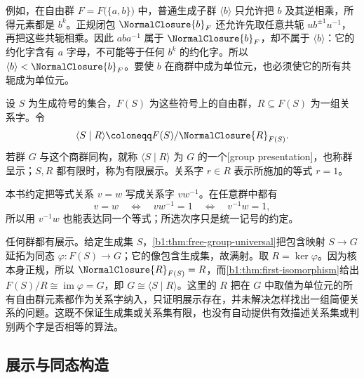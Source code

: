 \ProseParagraphBreak
例如，在自由群 \(F=F\bigl(\{a,b\}\bigr)\) 中，普通生成子群 \(\langle b\rangle\) 只允许把 \(b\) 及其逆相乘，所得元素都是 \(b^k\)。正规闭包 \(\NormalClosure{b}_{F}\) 还允许先取任意共轭 \(ub^{\pm1}u^{-1}\)，再把这些共轭相乘。因此 \(aba^{-1}\) 属于 \(\NormalClosure{b}_{F}\)，却不属于 \(\langle b\rangle\)：它的约化字含有 \(a\) 字母，不可能等于任何 \(b^k\) 的约化字。所以 \(\langle b\rangle<\NormalClosure{b}_{F}\)。要使 \(b\) 在商群中成为单位元，也必须使它的所有共轭成为单位元。

\begin{definition}\label{b1:def:group-presentation}
	设 \(S\) 为生成符号的集合，\(F(S)\) 为这些符号上的自由群，\(R\subseteq F(S)\) 为一组关系字。令
	\[
		\langle S\mid R\rangle \coloneqq F(S)/\NormalClosure{R}_{F(S)}.
	\]
	若群 \(G\) 与这个商群同构，就称 \(\langle S\mid R\rangle\) 为 \(G\) 的一个[group presentation]，也称群呈示；\(S,R\) 都有限时，称为有限展示。关系字 \(r\in R\) 表示所施加的等式 \(r=1\)。
\end{definition}

本书约定把等式关系 \(v=w\) 写成关系字 \(vw^{-1}\)。在任意群中都有
\[
	v=w\quad\Longleftrightarrow\quad vw^{-1}=1 \quad\Longleftrightarrow\quad v^{-1}w=1,
\]
所以用 \(v^{-1}w\) 也能表达同一个等式；所选次序只是统一记号的约定。

\ProseParagraphBreak
任何群都有展示。给定生成集 \(S\)，\cref{b1:thm:free-group-universal}把包含映射 \(S\to G\) 延拓为同态 \(\varphi:F(S)\to G\)；它的像包含生成集，故满射。取 \(R=\ker\varphi\)。因为核本身正规，所以 \(\NormalClosure{R}_{F(S)}=R\)，而\cref{b1:thm:first-isomorphism}给出 \(F(S)/R\cong\operatorname{im}\varphi=G\)，即 \(G\cong\langle S\mid R\rangle\)。这里的 \(R\) 把在 \(G\) 中取值为单位元的所有自由群元素都作为关系字纳入，只证明展示存在，并未解决怎样找出一组简便关系的问题。这既不保证生成集或关系集有限，也没有自动提供有效描述关系集或判别两个字是否相等的算法。

\subsection{展示与同态构造}
\label{b1:subsec:0802:02}

